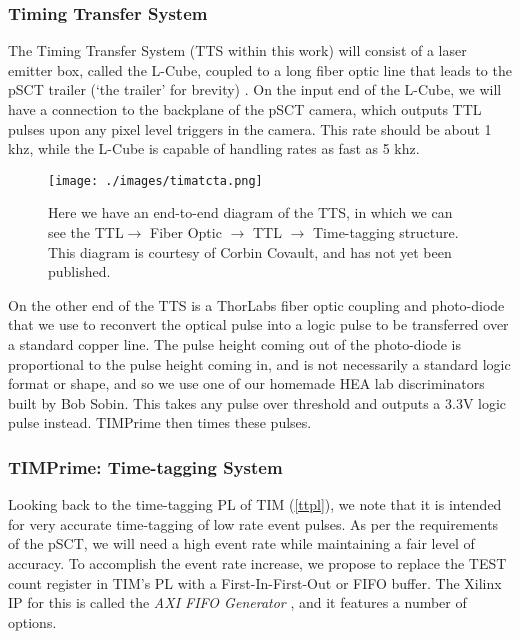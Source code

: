 \subsubsection{Timing Transfer System}
\label{ttrans}
The Timing Transfer System (TTS within this work) will consist of a laser emitter box, called the L-Cube, coupled to a long fiber optic line that leads to the pSCT trailer (`the trailer' for brevity) \cite{lcube}. On the input end of the L-Cube, we will have a connection to the backplane of the pSCT camera, which outputs TTL pulses upon any pixel level triggers in the camera. This rate should be about 1 khz, while the L-Cube is capable of handling rates as fast as 5 khz. 
\begin{figure}[h!]
\centering
\texttt{[image: ./images/timatcta.png]}
\caption[CTA Timing Transfer System]{Here we have an end-to-end diagram of the TTS, in which we can see the TTL$\rightarrow$ Fiber Optic $\rightarrow$ TTL $\rightarrow$ Time-tagging structure. This diagram is courtesy of Corbin Covault, and has not yet been published.}
\label{tts}
\end{figure}
On the other end of the TTS is a ThorLabs fiber optic coupling and photo-diode that we use to reconvert the optical pulse into a logic pulse to be transferred over a standard copper line. The pulse height coming out of the photo-diode is proportional to the pulse height coming in, and is not necessarily a standard logic format or shape, and so we use one of our homemade HEA lab discriminators built by Bob Sobin. This takes any pulse over threshold and outputs a 3.3V logic pulse instead. TIMPrime then times these pulses.

\subsubsection{TIMPrime: Time-tagging System}
Looking back to the time-tagging PL of TIM (\autoref{ttpl}), we note that it is intended for very accurate time-tagging of low rate event pulses. As per the requirements of the pSCT, we will need a high event rate while maintaining a fair level of accuracy. To accomplish the event rate increase, we propose to replace the TEST count register in TIM's PL with a First-In-First-Out or FIFO buffer. The Xilinx IP for this is called the \textit{AXI FIFO Generator} \cite{fifo}, and it features a number of options. 

